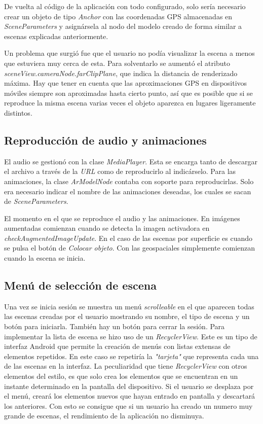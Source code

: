 De vuelta al código de la aplicación con todo configurado, solo sería necesario crear un objeto de tipo \textit{Anchor} con las coordenadas GPS almacenadas en \textit{SceneParameters} y asignársela al nodo del modelo creado de forma similar a escenas explicadas anteriormente.

Un problema que surgió fue que el usuario no podía visualizar la escena a menos que estuviera muy cerca de esta. Para solventarlo se aumentó el atributo \textit{sceneView.cameraNode.farClipPlane}, que indica la distancia de renderizado máxima. Hay que tener en cuenta que las aproximaciones GPS en dispositivos móviles siempre son aproximadas hasta cierto punto, así que es posible que si se reproduce la misma escena varias veces el objeto aparezca en lugares ligeramente distintos. 

\subsection{Reproducción de audio y animaciones}

El audio se gestionó con la clase \textit{MediaPlayer}. Esta se encarga tanto de descargar el archivo a través de la \textit{URL} como de reproducirlo al indicárselo. Para las animaciones, la clase \textit{ArModelNode} contaba con soporte para reproducirlas. Solo era necesario indicar el nombre de las animaciones deseadas, los cuales se sacan de \textit{SceneParameters}.

El momento en el que se reproduce el audio y las animaciones. En imágenes aumentadas comienzan cuando se detecta la imagen activadora en \textit{checkAugmentedImageUpdate}. En el caso de las escenas por superficie es cuando se pulsa el botón de \textit{Colocar objeto}. Con las geospaciales simplemente comienzan cuando la escena se inicia.

\subsection{Menú de selección de escena}

Una vez se inicia sesión se muestra un menú \textit{scrolleable} en el que aparecen todas las escenas creadas por el usuario mostrando su nombre, el tipo de escena y un botón para iniciarla. También hay un botón para cerrar la sesión. Para implementar la lista de escena se hizo uso de un \textit{RecyclerView}. Este es un tipo de interfaz Android que permite la creación de menús con listas extensas de elementos repetidos. En este caso se repetiría la \textit{"tarjeta"} que representa cada una de las escenas en la interfaz. La peculiaridad que tiene \textit{RecyclerView} con otros elementos del estilo, es que solo crea los elementos que se encuentran en un instante determinado en la pantalla del dispositivo. Si el usuario se desplaza por el menú, creará los elementos nuevos que hayan entrado en pantalla y descartará los anteriores. Con esto se consigue que si un usuario ha creado un numero muy grande de escenas, el rendimiento de la aplicación no disminuya.

